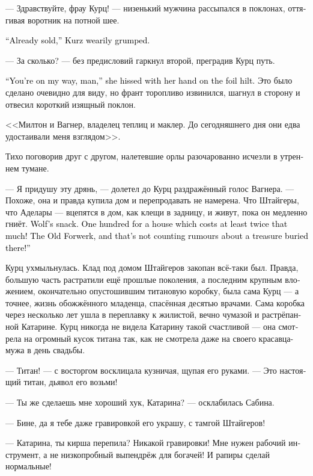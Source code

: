 \documentclass[a4paper,12pt,fleqn]{book}\usepackage{cooltooltips}\usepackage{polyglossia}\setdefaultlanguage[babelshorthands=true]{russian}\setotherlanguage{english}\defaultfontfeatures{Ligatures=TeX,Mapping=tex-text} \usepackage{xcolor}\definecolor{lightgray}{HTML}{bbbbbb}\color{lightgray}\newcommand{\ml}[3]{\textenglish{\textcolor{black}{#3}}}
\begin{document}
--- Здравствуйте, фрау Курц! --- низенький мужчина рассыпался в поклонах, оттягивая воротник на потной шее.

\ml{$0$}
{--- Уже продала, --- устало буркнула Курц.}
{``Already sold,'' Kurz wearily grumped.}

--- За сколько? --- без предисловий гаркнул второй, преградив Курц путь.

\ml{$0$}
{--- Уйди с дороги, --- процедила она, положив руку на эфес рапиры.}
{``You're on my way, man,'' she hissed with her hand on the foil hilt.}
Это было сделано очевидно для виду, но франт торопливо извинился, шагнул в сторону и отвесил короткий изящный поклон.

<<Милтон и Вагнер, владелец теплиц и маклер.
До сегодняшнего дня они едва удостаивали меня взглядом>>.

Тихо поговорив друг с другом, налетевшие орлы разочарованно исчезли в утреннем тумане.

--- Я придушу эту дрянь, --- долетел до Курц раздражённый голос Вагнера.
--- Похоже, она и правда купила дом и перепродавать не намерена.
Что Штайгеры, что Аделары --- вцепятся в дом, как клещи в задницу, и живут, пока он медленно гниёт.
\ml{$0$}
{Волчья сыть.}
{Wolf's snack.}
\ml{$0$}
{Продать за сто аркан дом, цена которому минимум двести!}
{One hundred for a house which costs at least twice that much!}
\ml{$0$}
{Старое имение --- и это даже не учитывая слухов, что там до сих пор закопан клад!}
{The Old Forwerk, and that's not counting rumours about a treasure buried there!''}

Курц ухмыльнулась.
Клад под домом Штайгеров закопан всё-таки был.
Правда, большую часть растратили ещё прошлые поколения, а последним крупным вложением, окончательно опустошившим титановую коробку, была сама Курц --- а точнее, жизнь обожжённого младенца, спасённая десятью врачами.
Сама коробка через несколько лет ушла в переплавку к жилистой, вечно чумазой и растрёпанной Катарине.
Курц никогда не видела Катарину такой счастливой --- она смотрела на огромный кусок титана так, как не смотрела даже на своего красавца-мужа в день свадьбы.

--- Титан! --- с восторгом восклицала кузничая, щупая его руками.
--- Это настоящий титан, дьявол его возьми!

--- Ты же сделаешь мне хороший хук, Катарина? --- осклабилась Сабина.

--- Бине, да я тебе даже гравировкой его украшу, с тамгой Штайгеров!

--- Катарина, ты кирша перепила?
Никакой гравировки!
Мне нужен рабочий инструмент, а не низкопробный выпендрёж для богачей!
И рапиры сделай нормальные!
\end{document}
